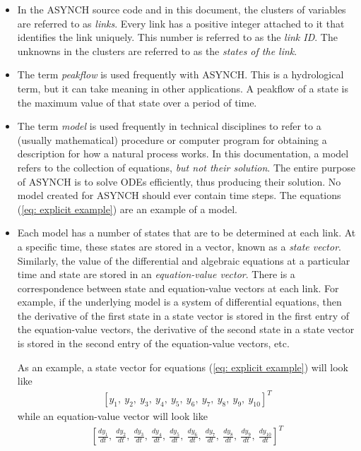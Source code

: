 \documentclass[12pt]{article}
\begin{document}
\begin{itemize}
 \item In the ASYNCH source code and in this document, the clusters of variables are referred to as \emph{links}. Every link has a positive integer attached to it that identifies the link uniquely. This number is referred to as the \emph{link ID}. The unknowns in the clusters are referred to as the \emph{states of the link}.
 
 \item The term \emph{peakflow} is used frequently with ASYNCH. This is a hydrological term, but it can take meaning in other applications. A peakflow of a state is the maximum value of that state over a period of time.

 \item The term \emph{model} is used frequently in technical disciplines to refer to a (usually mathematical) procedure or computer program for obtaining a description for how a natural process works. In this documentation, a model refers to the collection of equations, \emph{but not their solution}. The entire purpose of ASYNCH is to solve ODEs efficiently, thus producing their solution. No model created for ASYNCH should ever contain time steps. The equations (\ref{eq: explicit example}) are an example of a model.
 
 \item Each model has a number of states that are to be determined at each link. At a specific time, these states are stored in a vector, known as a \textit{state vector}. Similarly, the value of the differential and algebraic equations at a particular time and state are stored in an \textit{equation-value vector}. There is a correspondence between state and equation-value vectors at each link. For example, if the underlying model is a system of differential equations, then the derivative of the first state in a state vector is stored in the first entry of the equation-value vectors, the derivative of the second state in a state vector is stored in the second entry of the equation-value vectors, etc.
 
 As an example, a state vector for equations (\ref{eq: explicit example}) will look like
 \begin{align*}
  \left[ y_1,\ y_2,\ y_3,\ y_4,\ y_5,\ y_6,\ y_7,\ y_8,\ y_9,\ y_{10} \right]^T
 \end{align*}
 while an equation-value vector will look like
 \begin{align*}
  \left[ \frac{dy_1}{dt},\ \frac{dy_2}{dt},\ \frac{dy_3}{dt},\ \frac{dy_4}{dt},\ \frac{dy_5}{dt},\ \frac{dy_6}{dt},\ \frac{dy_7}{dt},\ \frac{dy_8}{dt},\ \frac{dy_9}{dt},\ \frac{dy_{10}}{dt} \right]^T
 \end{align*}


\end{itemize}
\end{document}
